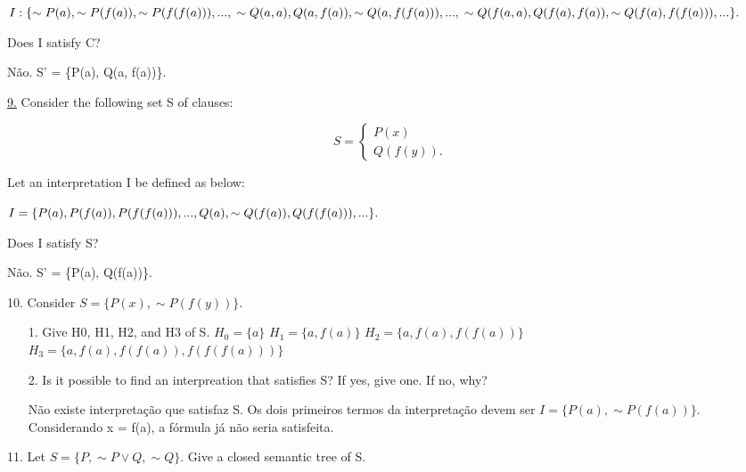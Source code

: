 $I:\\
\{ \sim P(a), \sim P(f(a)), \sim P(f(f(a))), ...,\\
\sim Q(a,a), Q(a, f(a)), \sim Q(a,f(f(a))), ...,\\
\sim Q(f(a,a),Q(f(a),f(a)), \sim Q(f(a), f(f(a))), ... \}.$

Does I satisfy C?

Não. S' = \{P(a), Q(a, f(a))\}.

\underline{9.} Consider the following set S of clauses:

\[
S =	\begin{cases}
		P(x) \\
		Q(f(y)).
	\end{cases}
\]

Let an interpretation I be defined as below:

$I =\\
\{P(a), P(f(a)), P(f(f(a))), ...,\\
Q(a), \sim Q(f(a)), Q(f(f(a))), ...\}.
$

Does I satisfy S?

Não. S' = \{P(a), Q(f(a))\}.

10. Consider $ S = \{P(x), \sim P(f(y))\} $.

\begin{itemize}
 \item[1.] Give H0, H1, H2, and H3 of S. \newline
$ H_0 = \{a\} $ \newline
$ H_1 = \{a, f(a)\} $ \newline
$ H_2 = \{a, f(a), f(f(a))\} $ \newline
$ H_3 = \{a, f(a), f(f(a)), f(f(f(a)))\} $
 \item[2.] Is it possible to find an interpreation that satisfies S? If yes, give one. If no, why?

Não existe interpretação que satisfaz S. Os dois primeiros termos da interpretação devem ser $I = \{ P(a), \sim P(f(a)) \}$. Considerando x = f(a), a fórmula já não seria satisfeita.
\end{itemize}

11. Let $ S = \{P, \sim P \vee Q, \sim Q\} $. Give a closed semantic tree of S.



